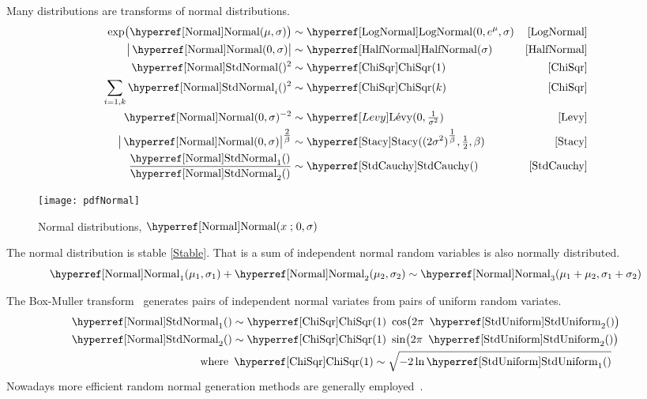 Many distributions are transforms of normal distributions.
\begin{align*}
\exp\bigl(\opr{Normal}(\mu,\sigma) \bigr) &\sim \opr{LogNormal}(0, e^\mu, \sigma) & \eqref{LogNormal}  \checked
\\
\big| \opr{Normal}(0,\sigma) \big|  & \sim  \opr{HalfNormal}( \sigma) & \eqref{HalfNormal} \checked
\\
\oprr{StdNormal}{Normal}()^{2} & \sim \opr{ChiSqr}(1)  & \eqref{ChiSqr}  \checked
\\
\sum_{i=1,k}\oprr{StdNormal}{Normal}_i()^{2} & \sim \opr{ChiSqr}(k)  & \eqref{ChiSqr} \checked
\\
\opr{Normal}(0,\sigma)^{-2} & \sim \Levy( 0, \tfrac{1}{\sigma^2})   & \eqref{Levy}  \checked
\\
\big|\opr{Normal}(0,\sigma)\big|^{\tfrac{2}{\beta}} & \sim \opr{Stacy}( (2\sigma^2)^{\tfrac{1}{\beta}}, \tfrac{1}{2}, \beta )  & \eqref{Stacy}  
\\
\frac{\oprr{StdNormal}{Normal}_1()}{\oprr{StdNormal}{Normal}_2()}  & \sim  \opr{StdCauchy}() &\eqref{StdCauchy} \checked
\end{align*}



\begin{figure}[t]
\begin{center}
\texttt{[image: pdfNormal]}
\end{center}
\caption[Normal distributions]{Normal distributions, $\opr{Normal}(x\given 0,\sigma)$}
\end{figure}


The normal distribution is stable \eqref{Stable}. That is a sum of independent normal random variables is also normally distributed.
\[
 \opr{Normal}_1(\mu_1,\sigma_1) +  \opr{Normal}_2(\mu_2,\sigma_2) \sim  \opr{Normal}_3(\mu_1+\mu_2,\sigma_1+\sigma_2)
\checked
\notag
\]

The Box-Muller transform~\cite{Box1958} generates pairs of independent normal variates from pairs of uniform random variates.
\begin{align*}
\oprr{StdNormal}{Normal}_1() & \sim \opr{ChiSqr}(1)\ \cos\bigl( 2\pi\ \opr{StdUniform}_2() \bigr) \checked
\\
\oprr{StdNormal}{Normal}_2() & \sim \opr{ChiSqr}(1)\ \sin\bigl( 2\pi\ \opr{StdUniform}_2() \bigr) \checked
\\
\text{where }& \opr{ChiSqr}(1) \sim\sqrt{ - 2 \ln \opr{StdUniform}_1()}  \checked
\end{align*}
Nowadays more efficient random normal generation methods are generally employed~.






